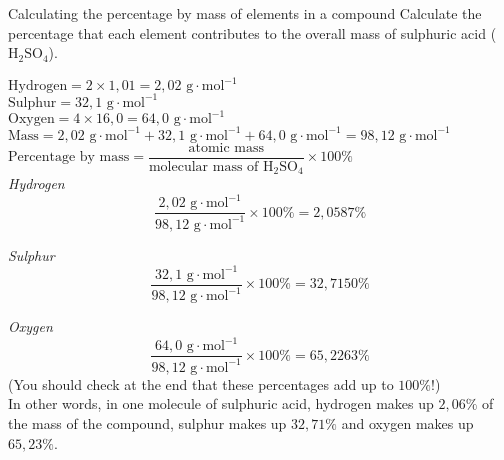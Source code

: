       \begin{wex}{Calculating the percentage by mass of elements in a compound }
{
Calculate the percentage that each element contributes to the overall mass of sulphuric acid (${\text{H}}_{2}{\text{SO}}_{4}$).
      }
{
$\text{Hydrogen}=2 \times 1,01 = 2,02 \text{ g} \cdot \text{mol}^{-1}$ \\ 
$\text{Sulphur}=32,1 \text{ g} \cdot \text{mol}^{-1}$ \\
$\text{Oxygen}=4 \times 16,0 = 64,0 \text{ g} \cdot \text{mol}^{-1}$
$\text{Mass}=2,02 \text{ g} \cdot \text{mol}^{-1} + 32,1 \text{ g} \cdot \text{mol}^{-1} + 64,0 \text{ g} \cdot \text{mol}^{-1} = 98,12 \text{ g} \cdot \text{mol}^{-1}$
      \label{m38712*id280688}$\text{Percentage by mass}=\dfrac{\text{atomic mass}}{\text{molecular mass of H}{}_{2}\text{SO}{}_{4}} \times 100\%$ \\

        \textsl{Hydrogen}      
      \label{m38712*id280735}\nopagebreak\noindent{}        
    \begin{equation*}
    \frac{2,02 \text{ g} \cdot \text{mol}^{-1}}{98,12 \text{ g} \cdot \text{mol}^{-1}}\ensuremath{\times}100\%=2,0587\%
      \end{equation*}

        \textsl{Sulphur}      
      \label{m38712*id280786}\nopagebreak\noindent{}        
    \begin{equation*}
    \frac{32,1 \text{ g} \cdot \text{mol}^{-1}}{98,12 \text{ g} \cdot \text{mol}^{-1}}\ensuremath{\times}100\%=32,7150\%
      \end{equation*}

        \textsl{Oxygen}     
      \label{m38712*id280837}\nopagebreak\noindent{}
    \begin{equation*}
    \frac{64,0 \text{ g} \cdot \text{mol}^{-1}}{98,12 \text{ g} \cdot \text{mol}^{-1}}\ensuremath{\times}100\%=65,2263\%
      \end{equation*}
      \label{m38712*id280876}(You should check at the end that these percentages add up to $100\%$!) \\
      \label{m38712*id280880}In other words, in one molecule of sulphuric acid, hydrogen makes up $2,06\%$ of the mass of the compound, sulphur makes up $32,71\%$ and oxygen makes up $65,23\%$. 
}
    \end{wex}
